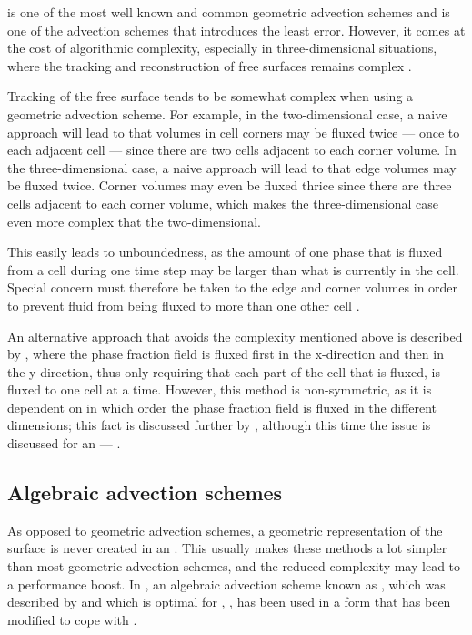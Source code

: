 \PLIC is one of the most well known and common geometric advection schemes and is one of the advection schemes that introduces the least error. However, it comes at the cost of algorithmic complexity, especially in three-dimensional situations, where the tracking and reconstruction of free surfaces remains complex \citep{Ingram2009}.

Tracking of the free surface tends to be somewhat complex when using a geometric advection scheme. For example, in the two-dimensional case, a naive approach will lead to that volumes in cell corners may be fluxed twice --- once to each adjacent cell --- since there are two cells adjacent to each corner volume. In the three-dimensional case, a naive approach will lead to that edge volumes may be fluxed twice. Corner volumes may even be fluxed thrice since there are three cells adjacent to each corner volume, which makes the three-dimensional case even more complex that the two-dimensional.

This easily leads to unboundedness, as the amount of one phase that is fluxed from a cell during one time step may be larger than what is currently in the cell. Special concern must therefore be taken to the edge and corner volumes in order to prevent fluid from being fluxed to more than one other cell \citep{Rider1997}.

An alternative approach that avoids the complexity mentioned above is described by \citet{Aulisa2003}, where the phase fraction field is fluxed first in the x-direction and then in the y-direction, thus only requiring that each part of the cell that is fluxed, is fluxed to one cell at a time. However, this method is non-symmetric, as it is dependent on in which order the phase fraction field is fluxed in the different dimensions; this fact is discussed further by \citet{Ubbink1999}, although this time the issue is discussed for an  --- \CICSAM.

\subsection{Algebraic advection schemes}

As opposed to geometric advection schemes, a geometric representation of the surface is never created in an . This usually makes these methods a lot simpler than most geometric advection schemes, and the reduced complexity may lead to a performance boost. In \thisprojectwork, an algebraic advection scheme known as , which was described by \citet{Leonard1988} and which is optimal for , , has been used in a form that has been modified to cope with .

